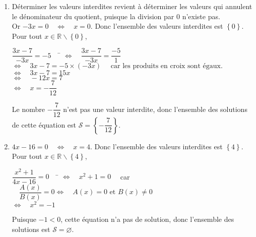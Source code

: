 \documentclass[a4paper,11pt,exos]{nsi} %
\begin{document}
\begin{enumerate}
    \item Déterminer les valeurs interdites revient à déterminer les valeurs qui annulent le dénominateur du quotient, puisque la division par $0$ n'existe pas.\\Or $-3x=0 \quad \iff \quad x=0$. Donc l'ensemble des valeurs interdites est  $\left\{0\right\}$. \\
          Pour tout $x\in \mathbb{R}\smallsetminus\left\{0\right\}$,
        \begin{tabbing}
            $\dfrac{3x-7}{-3x}=-5 \quad$ \= $\iff \quad \dfrac{3x-7}{-3x}=\dfrac{-5}{1}$\\
            \>  $\iff \quad 3x-7=-5\times(-3x)\quad \text{ car les produits en croix sont égaux.}$\\
            \>  $\iff \quad 3x-7= 15x$\\
            \>  $\iff \quad -12x= 7$\\
            \>  $\iff \quad x=-\dfrac{7}{12}$
        \end{tabbing}
    Le nombre $-\dfrac{7}{12}$ n'est pas une valeur interdite, donc l'ensemble des solutions de cette équation est  $\mathcal{S}=\left\{-\dfrac{7}{12}\right\}$.

    \item $4x-16=0 \quad \iff \quad x=4$. Donc l'ensemble des valeurs interdites est  $\left\{4\right\}$.\\
    Pour tout $x\in \mathbb{R}\smallsetminus\left\{4\right\}$,
    \begin{tabbing}
        $\dfrac{x^2+1}{4x-16}=0 \quad$ \=  $\iff \quad x^2+1=0\quad$  car $\quad\dfrac{A(x)}{B(x)}=0 \iff  \quad A(x)=0 \text { et } B(x)\neq 0$\\
        \>  $\iff \quad x^2=-1$
    \end{tabbing}
    Puisque $-1<0$, cette équation n'a pas de solution, donc l'ensemble des solutions est  $\mathcal{S}=\varnothing$.



\end{enumerate}
\end{document}
